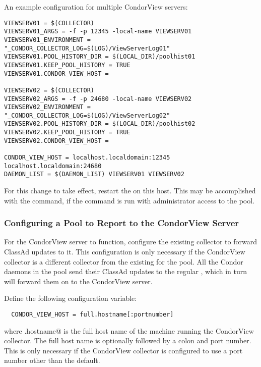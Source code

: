 An example configuration for multiple CondorView servers:
\footnotesize
\begin{verbatim}
VIEWSERV01 = $(COLLECTOR)
VIEWSERV01_ARGS = -f -p 12345 -local-name VIEWSERV01
VIEWSERV01_ENVIRONMENT = "_CONDOR_COLLECTOR_LOG=$(LOG)/ViewServerLog01"
VIEWSERV01.POOL_HISTORY_DIR = $(LOCAL_DIR)/poolhist01
VIEWSERV01.KEEP_POOL_HISTORY = TRUE
VIEWSERV01.CONDOR_VIEW_HOST =

VIEWSERV02 = $(COLLECTOR)
VIEWSERV02_ARGS = -f -p 24680 -local-name VIEWSERV02
VIEWSERV02_ENVIRONMENT = "_CONDOR_COLLECTOR_LOG=$(LOG)/ViewServerLog02"
VIEWSERV02.POOL_HISTORY_DIR = $(LOCAL_DIR)/poolhist02
VIEWSERV02.KEEP_POOL_HISTORY = TRUE
VIEWSERV02.CONDOR_VIEW_HOST =

CONDOR_VIEW_HOST = localhost.localdomain:12345 localhost.localdomain:24680
DAEMON_LIST = $(DAEMON_LIST) VIEWSERV01 VIEWSERV02
\end{verbatim}
\normalsize


For this change to take effect, restart the
 on this host.
This may be accomplished with the  command,
if the command is run with
administrator access to the pool.


\subsubsection{\label{sec:CondorView-Pool-Setup}
Configuring a Pool to Report to the CondorView Server} 

For the CondorView server to function, configure the existing collector to
forward ClassAd updates to it.
This configuration is only necessary if 
the CondorView collector is a different collector from the existing
 for the pool.
All the Condor daemons in the pool send their ClassAd updates to the
regular , which in turn will forward them on to the
CondorView server.

Define the following configuration variable:
\footnotesize
\begin{verbatim}
  CONDOR_VIEW_HOST = full.hostname[:portnumber]
\end{verbatim}
\normalsize
where \verb@full.hostname@ is the full host name of the machine 
running the CondorView collector.
The full host name is optionally followed by a colon and
port number.  This is only necessary if the CondorView
collector is configured to use a port number other than the default.

